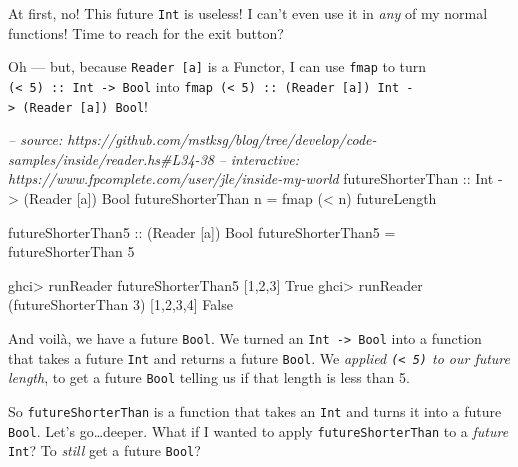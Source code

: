 \documentclass[]{article}
\newenvironment{Shaded}{}{}
\newcommand{\DataTypeTok}[1]{\textcolor[rgb]{0.56,0.13,0.00}{{#1}}}
\newcommand{\DecValTok}[1]{\textcolor[rgb]{0.25,0.63,0.44}{{#1}}}
\newcommand{\CommentTok}[1]{\textcolor[rgb]{0.38,0.63,0.69}{\textit{{#1}}}}
\newcommand{\OtherTok}[1]{\textcolor[rgb]{0.00,0.44,0.13}{{#1}}}
\newcommand{\FunctionTok}[1]{\textcolor[rgb]{0.02,0.16,0.49}{{#1}}}
\newcommand{\NormalTok}[1]{{#1}}
\begin{document}
At first, no! This future \texttt{Int} is useless! I can't even use it in \emph{any} of my normal
functions! Time to reach for the exit button?

Oh --- but, because \texttt{Reader\ {[}a{]}} is a Functor, I can use \texttt{fmap} to turn
\texttt{(\textless{}\ 5)\ ::\ Int\ -\textgreater{}\ Bool} into
\texttt{fmap\ (\textless{}\ 5)\ ::\ (Reader\ {[}a{]})\ Int\ -\textgreater{}\ (Reader\ {[}a{]})\ Bool}!

\begin{Shaded}
\begin{Highlighting}[]
\CommentTok{-- source: https://github.com/mstksg/blog/tree/develop/code-samples/inside/reader.hs#L34-38}
\CommentTok{-- interactive: https://www.fpcomplete.com/user/jle/inside-my-world}
\OtherTok{futureShorterThan ::} \DataTypeTok{Int} \OtherTok{->} \NormalTok{(}\DataTypeTok{Reader} \NormalTok{[a]) }\DataTypeTok{Bool}
\NormalTok{futureShorterThan n }\FunctionTok{=} \NormalTok{fmap (}\FunctionTok{<} \NormalTok{n) futureLength}

\OtherTok{futureShorterThan5 ::} \NormalTok{(}\DataTypeTok{Reader} \NormalTok{[a]) }\DataTypeTok{Bool}
\NormalTok{futureShorterThan5 }\FunctionTok{=} \NormalTok{futureShorterThan }\DecValTok{5}
\end{Highlighting}
\end{Shaded}

\begin{Shaded}
\begin{Highlighting}[]
\NormalTok{ghci}\FunctionTok{>} \NormalTok{runReader futureShorterThan5 [}\DecValTok{1}\NormalTok{,}\DecValTok{2}\NormalTok{,}\DecValTok{3}\NormalTok{]}
\DataTypeTok{True}
\NormalTok{ghci}\FunctionTok{>} \NormalTok{runReader (futureShorterThan }\DecValTok{3}\NormalTok{) [}\DecValTok{1}\NormalTok{,}\DecValTok{2}\NormalTok{,}\DecValTok{3}\NormalTok{,}\DecValTok{4}\NormalTok{]}
\DataTypeTok{False}
\end{Highlighting}
\end{Shaded}

And voilà, we have a future \texttt{Bool}. We turned an \texttt{Int\ -\textgreater{}\ Bool} into a
function that takes a future \texttt{Int} and returns a future \texttt{Bool}. We \emph{applied
\texttt{(\textless{}\ 5)} to our future length}, to get a future \texttt{Bool} telling us if that
length is less than 5.

So \texttt{futureShorterThan} is a function that takes an \texttt{Int} and turns it into a future
\texttt{Bool}. Let's go\ldots{}deeper. What if I wanted to apply \texttt{futureShorterThan} to a
\emph{future} \texttt{Int}? To \emph{still} get a future \texttt{Bool}?
\end{document}
